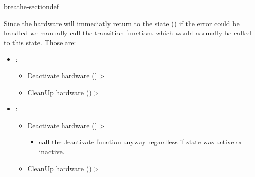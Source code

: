 \documentclass[letterpaper,10pt,english]{sphinxmanual}
\begin{document}
\begin{fulllineitems}
\begin{sphinxuseclass}{breathe-sectiondef}
\begin{fulllineitems}
\sphinxAtStartPar
Since the hardware will immediatly return to the  state () if the error could be handled we manually call the transition functions which would normally be called to this state. Those are:\begin{itemize}
\item {} 
\sphinxAtStartPar
{}: \begin{itemize}
\item {} 
\sphinxAtStartPar
Deactivate hardware ({\hyperref[\detokenize{code/bioscara_hardware_interfaces/index:classbioscara__hardware__interfaces_1_1BioscaraGripperHardwareInterface_1ab199edb3ee4a278fc8f5a24c2536fc14}]{}}) \sphinxhyphen{}\textgreater{} 

\item {} 
\sphinxAtStartPar
Clean\sphinxhyphen{}Up hardware ({\hyperref[\detokenize{code/bioscara_hardware_interfaces/index:classbioscara__hardware__interfaces_1_1BioscaraGripperHardwareInterface_1a5adcd99396a192989faaaaea5aeeffc1}]{}}) \sphinxhyphen{}\textgreater{} 

\end{itemize}


\item {} 
\sphinxAtStartPar
{}: \begin{itemize}
\item {} 
\sphinxAtStartPar
Deactivate hardware ({\hyperref[\detokenize{code/bioscara_hardware_interfaces/index:classbioscara__hardware__interfaces_1_1BioscaraGripperHardwareInterface_1ab199edb3ee4a278fc8f5a24c2536fc14}]{}}) \sphinxhyphen{}\textgreater{} \begin{itemize}
\item {} 
\sphinxAtStartPar
call the deactivate function anyway regardless if state was active or inactive.

\end{itemize}


\item {} 
\sphinxAtStartPar
Clean\sphinxhyphen{}Up hardware ({\hyperref[\detokenize{code/bioscara_hardware_interfaces/index:classbioscara__hardware__interfaces_1_1BioscaraGripperHardwareInterface_1a5adcd99396a192989faaaaea5aeeffc1}]{}}) \sphinxhyphen{}\textgreater{} 


\end{itemize}
\end{itemize}
\end{fulllineitems}
\end{sphinxuseclass}
\end{fulllineitems}
\end{document}
